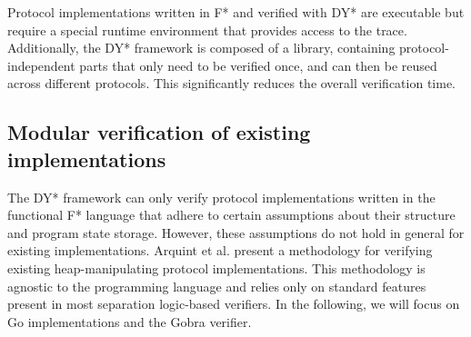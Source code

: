 Protocol implementations written in F* and verified with DY* are executable but require a special runtime environment that provides access to the trace. Additionally, the DY* framework is composed of a library, containing protocol-independent parts that only need to be verified once, and can then be reused across different protocols. This significantly reduces the overall verification time.

\subsection{Modular verification of existing implementations}
\label{sec:modular-verification-of-existing-implementations}

The DY* framework can only verify protocol implementations written in the functional F* language that adhere to certain assumptions about their structure and program state storage.
However, these assumptions do not hold in general for existing implementations.
Arquint et al.\cite{} present a methodology for verifying existing heap-manipulating protocol implementations. This methodology is agnostic to the programming language and relies only on standard features present in most separation logic-based verifiers. In the following, we will focus on Go implementations and the Gobra\cite{} verifier.

